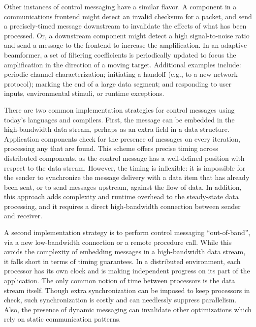 \documentclass{sig-alternate}
\begin{document}
Other instances of control messaging have a similar flavor.  A
component in a communications frontend might detect an invalid
checksum for a packet, and send a precisely-timed message downstream
to invalidate the effects of what has been processed.  Or, a
downstream component might detect a high signal-to-noise ratio and
send a message to the frontend to increase the amplification.  In an
adaptive beamformer, a set of filtering coefficients is periodically
updated to focus the amplification in the direction of a moving
target.  Additional examples include: periodic channel
characterization; initiating a handoff (e.g., to a new network
protocol); marking the end of a large data segment; and responding to
user inputs, environmental stimuli, or runtime exceptions.

There are two common implementation strategies for control messages
using today's languages and compilers.  First, the message can be
embedded in the high-bandwidth data stream, perhaps as an extra field
in a data structure.  Application components check for the presence of
messages on every iteration, processing any that are found.  This
scheme offers precise timing across distributed components, as the
control message has a well-defined position with respect to the data
stream.  However, the timing is inflexible: it is impossible for the
sender to synchronize the message delivery with a data item that has
already been sent, or to send messages upstream, against the flow of
data.  In addition, this approach adds complexity and runtime overhead
to the steady-state data processing, and it requires a direct
high-bandwidth connection between sender and receiver.

A second implementation strategy is to perform control messaging
``out-of-band'', via a new low-bandwidth connection or a remote
procedure call.  While this avoids the complexity of embedding
messages in a high-bandwidth data stream, it falls short in terms of
timing guarantees.  In a distributed environment, each processor has
its own clock and is making independent progress on its part of the
application.  The only common notion of time between processors is the
data stream itself.  Though extra synchronization can be imposed to
keep processors in check, such synchronization is costly and can
needlessly suppress parallelism.  Also, the presence of dynamic
messaging can invalidate other optimizations which rely on static
communication patterns.
\end{document}
